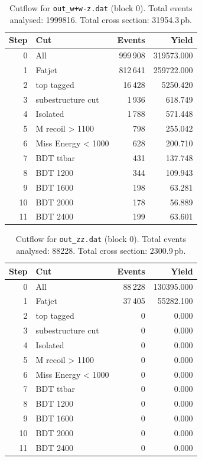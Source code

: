 \documentclass{article}
\begin{document}
\begin{table}[H]
\centering
\begin{tabular}{r l r r}
\toprule
Step & Cut & Events & Yield \\
\midrule
0 & All & 999\,908 & 319573.000 \\
1 & Fatjet & 812\,641 & 259722.000 \\
2 & top tagged & 16\,428 & 5250.420 \\
3 & subestructure cut & 1\,936 & 618.749 \\
4 & Isolated & 1\,788 & 571.448 \\
5 & M recoil > 1100 & 798 & 255.042 \\
6 & Miss Energy < 1000 & 628 & 200.710 \\
7 & BDT ttbar & 431 & 137.748 \\
8 & BDT 1200 & 344 & 109.943 \\
9 & BDT 1600 & 198 & 63.281 \\
10 & BDT 2000 & 178 & 56.889 \\
11 & BDT 2400 & 199 & 63.601 \\
\bottomrule
\end{tabular}
\caption{Cutflow for \texttt{out\_w+w-z.dat} (block 0). Total events analysed: 1999816. Total cross section: 31954.3\,pb.}
\label{tab:cutflow-out-w-w-z-dat}
\end{table}

\begin{table}[H]
\centering
\begin{tabular}{r l r r}
\toprule
Step & Cut & Events & Yield \\
\midrule
0 & All & 88\,228 & 130395.000 \\
1 & Fatjet & 37\,405 & 55282.100 \\
2 & top tagged & 0 & 0.000 \\
3 & subestructure cut & 0 & 0.000 \\
4 & Isolated & 0 & 0.000 \\
5 & M recoil > 1100 & 0 & 0.000 \\
6 & Miss Energy < 1000 & 0 & 0.000 \\
7 & BDT ttbar & 0 & 0.000 \\
8 & BDT 1200 & 0 & 0.000 \\
9 & BDT 1600 & 0 & 0.000 \\
10 & BDT 2000 & 0 & 0.000 \\
11 & BDT 2400 & 0 & 0.000 \\
\bottomrule
\end{tabular}
\caption{Cutflow for \texttt{out\_zz.dat} (block 0). Total events analysed: 88228. Total cross section: 2300.9\,pb.}
\label{tab:cutflow-out-zz-dat}
\end{table}
\end{document}
